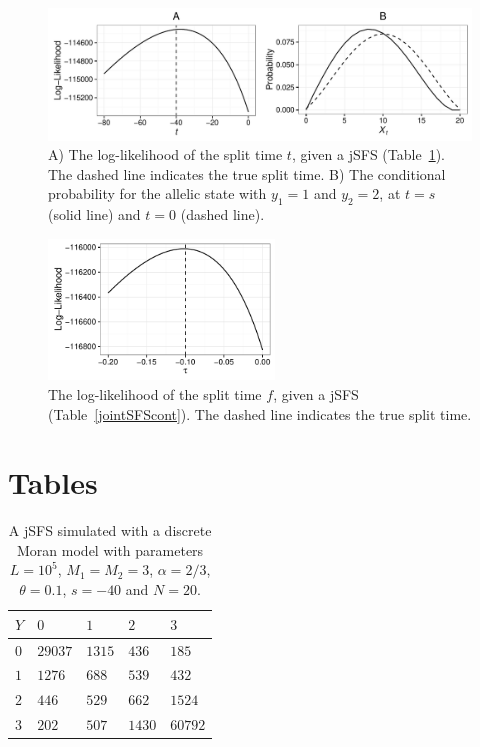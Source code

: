 \documentclass[preprint]{elsarticle}
\newcommand\y{\ensuremath{Y}}
\begin{document}
\begin{figure}[ht]
\includegraphics[width = 12cm]{twoPop_29_8_2016.pdf}
\caption{A) The log-likelihood of the split time $t$, given a jSFS (Table~\ref{jointSFSdiscr}). The dashed line indicates the true split time. B) The conditional probability for the allelic state with $y_1=1$ and $y_2=2$, at $t=s$ (solid line) and $t=0$ (dashed line).}\label{twoPopdiscr}
\end{figure}

\begin{figure}[ht]
\includegraphics[width = 6cm]{forw_back_ll_cont.pdf}
\caption{The log-likelihood of the split time $f$, given a jSFS (Table~\ref{jointSFScont}). The dashed line indicates the true split time.}\label{twoPopcont}
\end{figure}

\clearpage

\section*{Tables}

\begin{table}[ht]
\centering
\caption{A jSFS simulated with a discrete Moran model with parameters $L=10^5$, $M_1=M_2=3$, $\alpha=2/3$, $\theta=0.1$, $s=-40$ and $N=20$.}
  \begin{tabular}{lllll}
  \toprule
    $\y$&$0$&$1$&$2$&$3$\\
    \midrule
    $0$  &$29037$ &$1315$ &$436$  &$185$\\ 
    $1$  &$1276$  &$688$  &$539$  &$432$\\  
    $2$  &$446$   &$529$  &$662$  &$1524$\\  
    $3$  &$202$   &$507$  &$1430$ &$60792$\\
    \bottomrule
  \end{tabular}\label{jointSFSdiscr}
\end{table}
\end{document}
